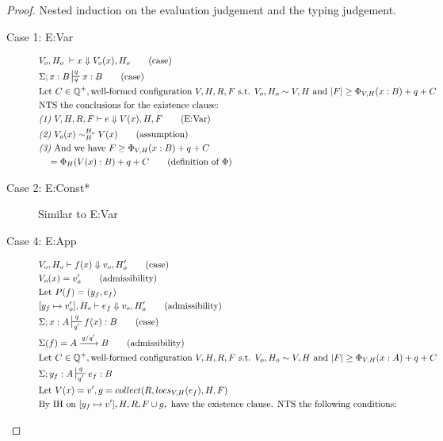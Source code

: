 \documentclass[11pt]{article}
\newcommand{\veq}[4]{#3 \sim^{#1}_{#2} #4}
\theoremstyle{definition}
\begin{document}
\begin{proof}
Nested induction on the evaluation judgement and the typing judgement.\\
\begin{description}
  \item[Case 1: E:Var]
  \begin{align*}
  &V_o,H_o \; \vdash x \Downarrow V_o(x),H_o \tag{case}\\
  &\Sigma; x : B \sststile{q}{q} x : B \tag{case}\\
		&\text{Let } C \in \mathbb{Q}^+, \text{well-formed configuration } V,H,R,F \text{ s.t. }
		V_o,H_o \sim V,H
			\text{ and }|F| \ge \Phi_{V,H}(x : B) + q + C\\
		&\text{NTS the conclusions for the existence clause: }\\
		&\emph{(1) }V,H,R,F \vdash e \Downarrow V(x),H,F \tag{E:Var}\\
		&\emph{(2) }\veq{H_o}{H}{V_o(x)}{V(x)} \tag{assumption}\\
		&\emph{(3) }\text{And we have } F \ge \Phi_{V,H}(x : B) + q + C\\
	&\quad = \Phi_{H}(V(x) : B) + q + C \tag{definition of $\Phi$}\\
  \end{align*}
  \item[Case 2: E:Const*] Similar to E:Var
  \item[Case 4: E:App]
		\begin{align*}
			&V_o,H_o \vdash f(x) \Downarrow v_o,H_o' \tag{case}\\
			&V_o(x) = v_o' \tag{admissibility}\\
			&\text{Let } P(f) = (y_f,e_f)\\
			&[y_f \mapsto v_o'],H_o \vdash e_f \Downarrow v_o,H_o' \tag{admissibility}\\
			&\Sigma; x : A \sststile{q'}{q} f(x) : B \tag{case}\\
			&\Sigma(f) = A \xrightarrow{q/q'} B \tag{admissibility}\\
		&\text{Let } C \in \mathbb{Q}^+, \text{well-formed configuration } V,H,R,F \text{ s.t. }
		V_o,H_o \sim V,H
			\text{ and }|F| \ge \Phi_{V,H}(x : A) + q + C\\
			&\Sigma; y_f : A \sststile{q'}{q} e_f : B \\
			&\text{Let } V(x) = v', g = collect(R,locs_{V,H}(e_f),H,F)\\
			&\text{By IH on } [y_f \mapsto v'],H,R,F\cup g, \text{ have the  existence clause. NTS the
				following conditions: }\\

\end{align*}
\end{description}
\end{proof}
\end{document}
